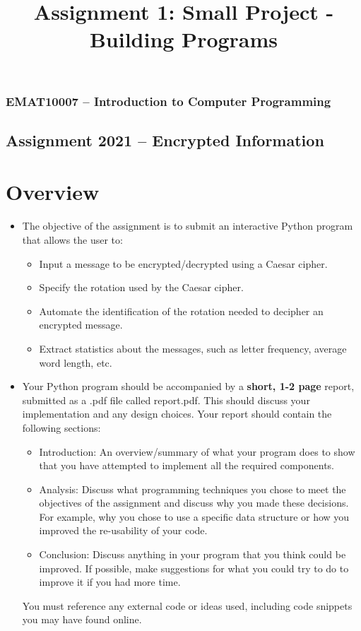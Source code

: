 \documentclass[11pt]{report}
\begin{document}
\title{Assignment 1: Small Project - Building Programs}
\subsubsection*{EMAT10007 -- Introduction to Computer Programming}
\subsection*{\Large Assignment 2021 -- Encrypted Information}

\section*{Overview}
\begin{itemize}
	\item The objective of the assignment is to submit an interactive Python program that allows the user to:
	\begin{itemize}
		\item Input a message to be encrypted/decrypted using a Caesar cipher.
    	\item Specify the rotation used by the Caesar cipher.
    	\item Automate the identification of the rotation needed to decipher an encrypted message.
		\item Extract statistics about the messages, such as letter frequency, average word length, etc.
	\end{itemize}
	
	\item Your Python program should be accompanied by a {\bf short, 1-2 page} report, submitted as a .pdf file called report.pdf. This should discuss your implementation and any design choices. Your report should contain the following sections:
	\begin{itemize}
		\item Introduction: An overview/summary of what your program does to show that you have attempted to implement all the required components.
    	\item Analysis: Discuss what programming techniques you chose to meet the objectives of the assignment and discuss why you made these decisions. For example, why you chose to use a specific data structure or how you improved the re-usability of your code. 
    	\item Conclusion: Discuss anything in your program that you think could be improved. If possible, make
suggestions for what you could try to do to improve it if you had more time.
	\end{itemize}
    You must reference any external code or ideas used, including code snippets you may have found online.
	

\end{itemize}
\end{document}
